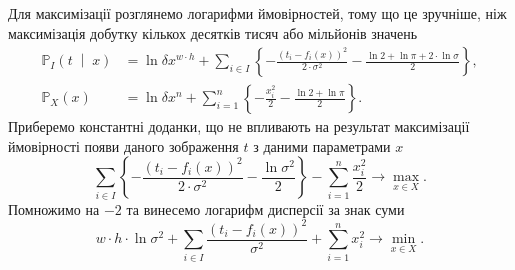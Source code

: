 Для максимізації розглянемо логарифми ймовірностей,
тому що це зручніше,
ніж максимізація добутку кількох десятків тисяч або мільйонів значень
\begin{equation*}
  \begin{split}
    \mathbb{P}_I\left( t \;\middle|\; x \right)
    &= \ln{\delta x^{w \cdot h}} +
        \sum_{i \in I}
        \left\{
          - \frac{\left( t_i - f_i\left( x \right) \right)^2}{2 \cdot \sigma^2}
          - \frac{\ln{2} + \ln{\pi} + 2 \cdot \ln{\sigma}}{2}
        \right\}, \\
    \mathbb{P}_X\left( x \right)
    &= \ln{\delta x^n} +
        \sum_{i = 1}^n
        \left\{
          - \frac{x_i^2}{2}
          - \frac{\ln{2} + \ln{\pi}}{2}
        \right\}.
  \end{split}
\end{equation*}
Приберемо константні доданки,
що не впливають на результат максимізації ймовірності
появи даного зображення $t$ з даними параметрами $x$
\begin{equation*}
  \sum_{i \in I}
    \left\{
      - \frac{\left( t_i - f_i\left( x \right) \right)^2}{2 \cdot \sigma^2}
      - \frac{\ln{\sigma^2}}{2}
    \right\}
  - \sum_{i = 1}^n \frac{x_i^2}{2}
  \to \max\limits_{x \in X}.
\end{equation*}
Помножимо на $-2$ та винесемо логарифм дисперсії за знак суми
\begin{equation}\label{eq:minimize}
  w \cdot h \cdot \ln{\sigma^2}
  + \sum_{i \in I} \frac{\left( t_i - f_i\left( x \right) \right)^2}{\sigma^2}
  + \sum_{i = 1}^n x_i^2
  \to \min\limits_{x \in X}.
\end{equation}


